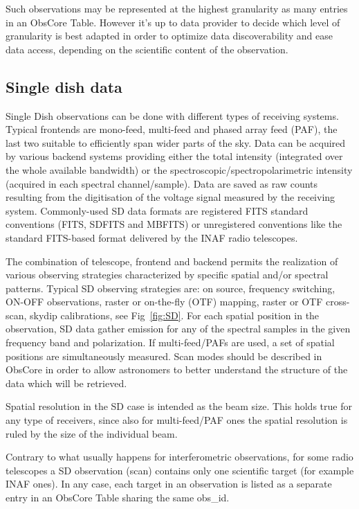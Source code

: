 \documentclass[11pt,a4paper]{ivoa}
\begin{document}
Such observations may be represented at the highest granularity as many entries in an ObsCore Table. However it's up to data provider to decide which level of granularity is best adapted in order to optimize data discoverability and ease data access, depending on the scientific content of the observation.



\subsection{Single dish data}\label{subsec:sd}

Single Dish observations can be done with different types of receiving systems. Typical frontends are mono-feed, multi-feed and phased array feed (PAF), the last two suitable to efficiently span wider parts of the sky.
Data can be acquired by various backend systems providing either the total intensity (integrated over the whole available bandwidth) or the spectroscopic/spectropolarimetric intensity (acquired in each spectral channel/sample).
Data are saved as raw counts resulting from the digitisation of the voltage signal measured by the receiving system.
Commonly-used SD data formats are registered FITS standard conventions (FITS, SDFITS and MBFITS) or unregistered conventions like the standard FITS-based format delivered by the INAF radio telescopes.

The combination of telescope, frontend and backend permits the realization of various observing strategies characterized by specific spatial and/or spectral patterns.
Typical SD observing strategies are: on source, frequency switching, ON-OFF observations, raster or on-the-fly (OTF) mapping, raster or OTF cross-scan, skydip calibrations, see Fig~\ref{fig:SD}. For each spatial position in the observation, SD data gather emission for any of the spectral samples in the given frequency band and polarization.
If multi-feed/PAFs are used, a set of spatial positions are simultaneously measured. Scan modes should be described in ObsCore in order to allow astronomers to better understand the structure of the data which will be retrieved.

Spatial resolution in the SD case is intended as the beam size. This holds true for any type of receivers, since also for multi-feed/PAF ones the spatial resolution is ruled by the size of the individual beam.

Contrary to what usually happens for  interferometric observations, for some radio telescopes a SD observation (scan) contains only one scientific target (for example INAF ones). In any case, each target in an observation is listed as a separate entry in an ObsCore Table sharing the same obs\_id.
\end{document}
